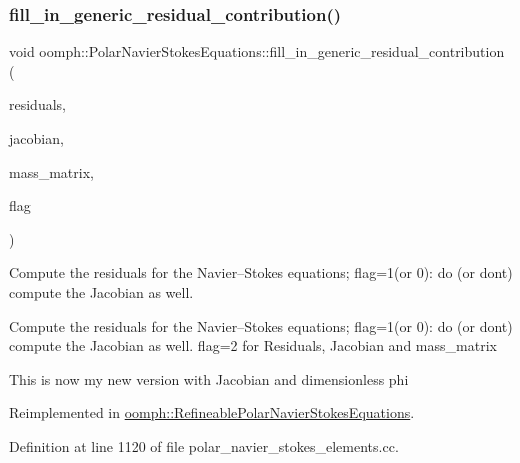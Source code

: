 \mbox{\label{classoomph_1_1PolarNavierStokesEquations_ad0188bfed5fc5e929017226cde427839}} 
\subsubsection{\texorpdfstring{fill\+\_\+in\+\_\+generic\+\_\+residual\+\_\+contribution()}{fill\_in\_generic\_residual\_contribution()}}
{\footnotesize\ttfamily void oomph\+::\+Polar\+Navier\+Stokes\+Equations\+::fill\+\_\+in\+\_\+generic\+\_\+residual\+\_\+contribution (\begin{DoxyParamCaption}\item[{\hyperlink{classoomph_1_1Vector}{Vector}$<$ double $>$ \&}]{residuals,  }\item[{\hyperlink{classoomph_1_1DenseMatrix}{Dense\+Matrix}$<$ double $>$ \&}]{jacobian,  }\item[{\hyperlink{classoomph_1_1DenseMatrix}{Dense\+Matrix}$<$ double $>$ \&}]{mass\+\_\+matrix,  }\item[{unsigned}]{flag }\end{DoxyParamCaption})\hspace{0.3cm}{\ttfamily [virtual]}}



Compute the residuals for the Navier--Stokes equations; flag=1(or 0)\+: do (or don\textquotesingle{}t) compute the Jacobian as well. 

Compute the residuals for the Navier--Stokes equations; flag=1(or 0)\+: do (or don\textquotesingle{}t) compute the Jacobian as well. flag=2 for Residuals, Jacobian and mass\+\_\+matrix

This is now my new version with Jacobian and dimensionless phi 

Reimplemented in \hyperlink{classoomph_1_1RefineablePolarNavierStokesEquations_a57ee96ad52906cc81b27676a1cc9fb25}{oomph\+::\+Refineable\+Polar\+Navier\+Stokes\+Equations}.



Definition at line 1120 of file polar\+\_\+navier\+\_\+stokes\+\_\+elements.\+cc.



